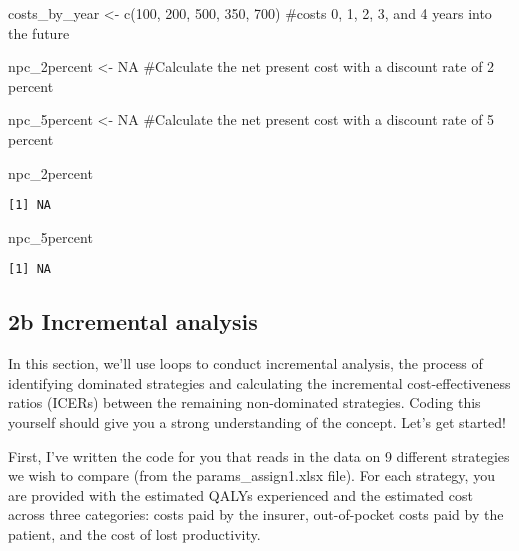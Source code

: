 \documentclass[
  letterpaper,
  DIV=11,
  numbers=noendperiod]{scrartcl}
\newenvironment{Shaded}{\begin{snugshade}}{\end{snugshade}}
\newcommand{\CommentTok}[1]{\textcolor[rgb]{0.37,0.37,0.37}{#1}}
\newcommand{\ConstantTok}[1]{\textcolor[rgb]{0.56,0.35,0.01}{#1}}
\newcommand{\DecValTok}[1]{\textcolor[rgb]{0.68,0.00,0.00}{#1}}
\newcommand{\FunctionTok}[1]{\textcolor[rgb]{0.28,0.35,0.67}{#1}}
\newcommand{\NormalTok}[1]{\textcolor[rgb]{0.00,0.23,0.31}{#1}}
\newcommand{\OtherTok}[1]{\textcolor[rgb]{0.00,0.23,0.31}{#1}}
\begin{document}
\begin{Shaded}
\begin{Highlighting}[]
\NormalTok{costs\_by\_year }\OtherTok{\textless{}{-}} \FunctionTok{c}\NormalTok{(}\DecValTok{100}\NormalTok{, }\DecValTok{200}\NormalTok{, }\DecValTok{500}\NormalTok{, }\DecValTok{350}\NormalTok{, }\DecValTok{700}\NormalTok{) }\CommentTok{\#costs 0, 1, 2, 3, and 4 years into the future}

\NormalTok{npc\_2percent }\OtherTok{\textless{}{-}} \ConstantTok{NA} \CommentTok{\#Calculate the net present cost with a discount rate of 2 percent}

\NormalTok{npc\_5percent }\OtherTok{\textless{}{-}} \ConstantTok{NA} \CommentTok{\#Calculate the net present cost with a discount rate of 5 percent}

\NormalTok{npc\_2percent}
\end{Highlighting}
\end{Shaded}

\begin{verbatim}
[1] NA
\end{verbatim}

\begin{Shaded}
\begin{Highlighting}[]
\NormalTok{npc\_5percent}
\end{Highlighting}
\end{Shaded}

\begin{verbatim}
[1] NA
\end{verbatim}

\hypertarget{b-incremental-analysis}{%
\subsection{2b Incremental analysis}\label{b-incremental-analysis}}

In this section, we'll use loops to conduct incremental analysis, the
process of identifying dominated strategies and calculating the
incremental cost-effectiveness ratios (ICERs) between the remaining
non-dominated strategies. Coding this yourself should give you a strong
understanding of the concept. Let's get started!

First, I've written the code for you that reads in the data on 9
different strategies we wish to compare (from the params\_assign1.xlsx
file). For each strategy, you are provided with the estimated QALYs
experienced and the estimated cost across three categories: costs paid
by the insurer, out-of-pocket costs paid by the patient, and the cost of
lost productivity.
\end{document}
